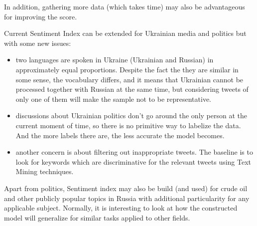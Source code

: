 \documentclass[12pt,a4paper]{article}
\begin{document}
In addition, gathering more data (which takes time) may also be advantageous for improving the score. 

Current Sentiment Index can be extended for Ukrainian media and politics but with some new issues:
\begin{itemize}
\item two languages are spoken in Ukraine (Ukrainian and Russian) in approximately equal proportions. Despite the fact the they are similar in some sense, the vocabulary differs, and it means that Ukrainian cannot be processed together with Russian at the same time, but considering tweets of only one of them will make the sample not to be representative.
\item discussions about Ukrainian politics don't go around the only person at the current moment of time, so there is no primitive way to labelize the data. And the more labels there are, the less accurate the model becomes.
\item another concern is about filtering out inappropriate tweets. The baseline is to look for keywords which are discriminative for the relevant tweets using Text Mining techniques.
\end{itemize}

Apart from politics, Sentiment index may also be build (and used) for crude oil and other publicly popular topics in Russia with additional particularity for any applicable subject. Normally, it is interesting to look at how the constructed model will generalize for similar tasks applied to other fields. 
\end{document}
